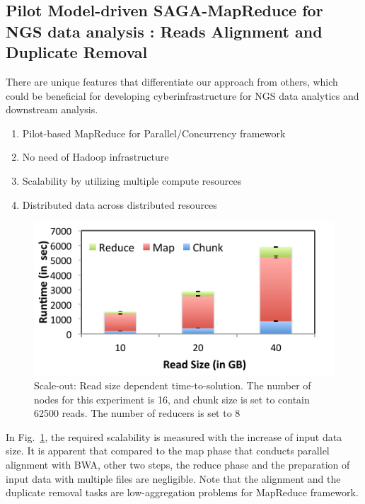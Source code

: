 \documentclass{sig-alternate}
\begin{document}
\subsection{Pilot Model-driven SAGA-MapReduce for NGS data analysis : Reads Alignment and Duplicate Removal}

There are unique features that differentiate our approach from others, which could be beneficial for developing cyberinfrastructure for NGS data analytics and downstream analysis.  
\begin{enumerate}

\item Pilot-based MapReduce for Parallel/Concurrency framework 
\item No need of Hadoop infrastructure
\item Scalability by utilizing multiple compute resources
\item Distributed data across distributed resources
\end{enumerate}
 
 \begin{figure}
 \centering
\includegraphics[scale=0.50]{figures/pj-smr-tts.pdf} 
\caption{\small Scale-out: Read size dependent time-to-solution.  The number of nodes for this experiment is 16, and chunk size is set to contain 62500 reads.  The number of reducers is set to 8}
  \label{fig:read-size} 
\end{figure}

 In Fig.~\ref{fig:read-size}, the required scalability is measured with the increase of input data size.  It is apparent that compared to the map phase that conducts parallel alignment with BWA, other two steps, the reduce phase and the preparation of input data with multiple files are negligible.  Note that the alignment and the duplicate removal tasks are low-aggregation problems for MapReduce framework.  
\end{document}

